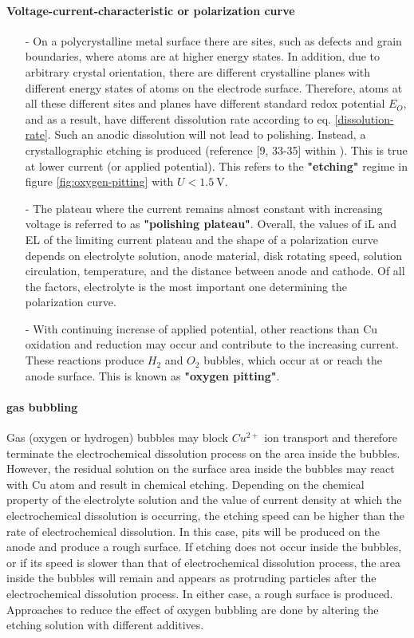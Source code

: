 \paragraph{Voltage-current-characteristic or polarization curve}
\begin{itemize}
	\item[-]On a polycrystalline metal surface there are sites, such as defects and grain boundaries, where atoms are at higher energy states. In addition, due to arbitrary crystal orientation, there are different crystalline planes with different energy states of atoms on the electrode surface. Therefore, atoms at all these different sites and planes have different standard redox potential $E_O$, and as a result, have different dissolution rate according to eq. \ref{dissolution-rate}. Such an anodic dissolution will not lead to polishing. Instead, a crystallographic etching is produced (reference [9, 33-35] within \cite{jinshan_electrochemical_2004}). This is true at lower current (or applied potential). This refers to the \textbf{"etching"} regime in figure \ref{fig:oxygen-pitting} with $U<\SI{1.5}{\volt}$.
	\item[-]The plateau where the current remains almost constant with increasing voltage is referred to as \textbf{"polishing plateau"}. Overall, the values of iL and EL of the limiting current plateau and the shape of a polarization curve depends on electrolyte solution, anode material, disk rotating speed, solution circulation, temperature, and the distance between anode and cathode.
	Of all the factors, electrolyte is the most important one determining the polarization curve.
	\item[-]With continuing increase of applied potential, other reactions than Cu oxidation and reduction may occur and contribute to the increasing current. These reactions produce $H_2$ and $O_2$ bubbles, which occur at or reach the anode surface. This is known as \textbf{"oxygen pitting"}.
\end{itemize}

\paragraph{gas bubbling}
Gas (oxygen or hydrogen) bubbles may block $Cu^{2+}$ ion transport and therefore terminate the electrochemical dissolution process on the area inside the bubbles. However, the residual solution on the surface area inside the bubbles may react with Cu atom and result in chemical etching. Depending on the chemical property of the electrolyte solution and the value of current density at which the electrochemical dissolution is occurring, the etching speed can be higher than the rate of electrochemical dissolution. In this case, pits will be produced on the anode and produce a rough surface. If etching does not occur inside the bubbles, or if its speed is slower than that of electrochemical dissolution process, the area inside the bubbles will remain and appears as protruding particles after the electrochemical dissolution process. In either case, a rough surface is produced. Approaches to reduce the effect of oxygen bubbling are done by altering the etching solution with different additives.

